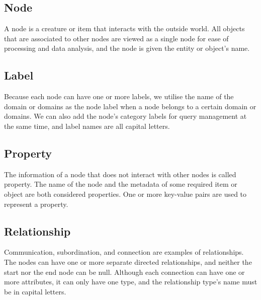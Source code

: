 \documentclass[paper=a4, fontsize=11pt]{scrartcl}
\numberwithin{equation}{section}		%
\numberwithin{figure}{section}			%
\numberwithin{table}{section}				%
\begin{document}
\subsection {Node}
A node is a creature or item that interacts with the outside world. All objects that are associated to other nodes are viewed as a single node for ease of processing and data analysis, and the node is given the entity or object's name.

\subsection {Label}
Because each node can have one or more labels, we utilise the name of the domain or domains as the node label when a node belongs to a certain domain or domains. We can also add the node's category labels for query management at the same time, and label names are all capital letters.

\newpage
\subsection {Property}
The information of a node that does not interact with other nodes is called property. The name of the node and the metadata of some required item or object are both considered properties. One or more key-value pairs are used to represent a property.

\subsection {Relationship}
Communication, subordination, and connection are examples of relationships. The nodes can have one or more separate directed relationships, and neither the start nor the end node can be null. Although each connection can have one or more attributes, it can only have one type, and the relationship type's name must be in capital letters.
\end{document}
